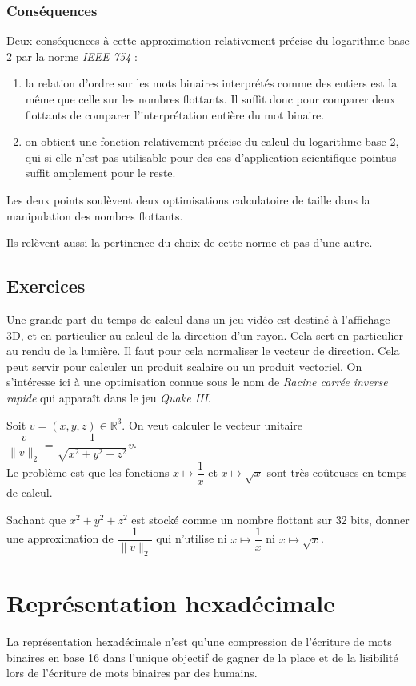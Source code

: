 \documentclass[../../main.tex]{subfiles}
\begin{document}
\subsubsection{Conséquences} \label{ssub:cons_quences}
Deux conséquences à cette approximation relativement précise du logarithme base 2 par la norme \textit{IEEE 754} :
\begin{enumerate}
  \item la relation d'ordre sur les mots binaires interprétés comme des entiers est la même que celle sur les nombres flottants. Il suffit donc pour comparer deux flottants de comparer l'interprétation entière du mot binaire.
  \item on obtient une fonction relativement précise du calcul du logarithme base 2, qui si elle n'est pas utilisable pour des cas d'application scientifique pointus suffit amplement pour le reste.
\end{enumerate}
Les deux points soulèvent deux optimisations calculatoire de taille dans la manipulation des nombres flottants.

Ils relèvent aussi la pertinence du choix de cette norme et pas d'une autre.
\subsection{Exercices}
 Une grande part du temps de calcul dans un jeu-vidéo est destiné à l'affichage 3D, et en particulier au calcul de la direction d'un rayon. Cela sert en particulier au rendu de la lumière. Il faut pour cela normaliser le vecteur de direction. Cela peut servir pour calculer un produit scalaire ou un produit vectoriel. On s'intéresse ici à une optimisation connue sous le nom de \textit{Racine carrée inverse rapide} qui apparaît dans le jeu \textit{Quake III}.

Soit $v = (x, y, z)\in\mathbb{R}^3$. On veut calculer le vecteur unitaire $\dfrac{v}{\lVert v\rVert_2} = \dfrac{1}{\sqrt{x^2 + y^2 + z^2}}v$. \\
Le problème est que les fonctions $x\mapsto\dfrac{1}{x}$ et $x\mapsto\sqrt{x}$ sont très coûteuses en temps de calcul.

Sachant que $x^2 + y^2 + z^2$ est stocké comme un nombre flottant sur 32 bits, donner une approximation de $\dfrac{1}{\lVert v\rVert_2}$ qui n'utilise ni $x\mapsto\dfrac{1}{x}$ ni $x\mapsto\sqrt{x}$.
\section{Représentation hexadécimale} \label{sec:repr_sentation_hexad_cimale}
La représentation hexadécimale n'est qu'une compression de l'écriture de mots binaires en base 16 dans l'unique objectif de gagner de la place et de la lisibilité lors de l'écriture de mots binaires par des humains.
\end{document}
